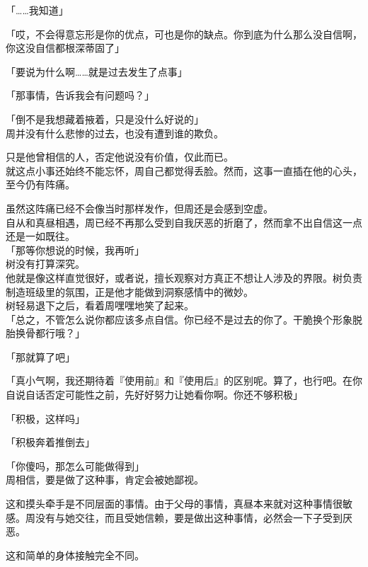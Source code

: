 「……我知道」

「哎，不会得意忘形是你的优点，可也是你的缺点。你到底为什么那么没自信啊，你这没自信都根深蒂固了」

「要说为什么啊……就是过去发生了点事」

「那事情，告诉我会有问题吗？」

「倒不是我想藏着掖着，只是没什么好说的」\\

周并没有什么悲惨的过去，也没有遭到谁的欺负。

只是他曾相信的人，否定他说没有价值，仅此而已。\\

就这点小事还始终不能忘怀，周自己都觉得丢脸。然而，这事一直插在他的心头，至今仍有阵痛。

虽然这阵痛已经不会像当时那样发作，但周还是会感到空虚。\\

自从和真昼相遇，周已经不再那么受到自我厌恶的折磨了，然而拿不出自信这一点还是一如既往。\\

「那等你想说的时候，我再听」\\

树没有打算深究。\\

他就是像这样直觉很好，或者说，擅长观察对方真正不想让人涉及的界限。树负责制造班级里的氛围，正是他才能做到洞察感情中的微妙。\\

树轻易退下之后，看着周嘿嘿地笑了起来。\\

「总之，不管怎么说你都应该多点自信。你已经不是过去的你了。干脆换个形象脱胎换骨都行哦？」

「那就算了吧」

「真小气啊，我还期待着『使用前』和『使用后』的区别呢。算了，也行吧。在你自说自话否定可能性之前，先好好努力让她看你啊。你还不够积极」

「积极，这样吗」

「积极奔着推倒去」

「你傻吗，那怎么可能做得到」\\

周相信，要是做了这种事，肯定会被她鄙视。

这和摸头牵手是不同层面的事情。由于父母的事情，真昼本来就对这种事情很敏感。周没有与她交往，而且受她信赖，要是做出这种事情，必然会一下子受到厌恶。

这和简单的身体接触完全不同。\\

